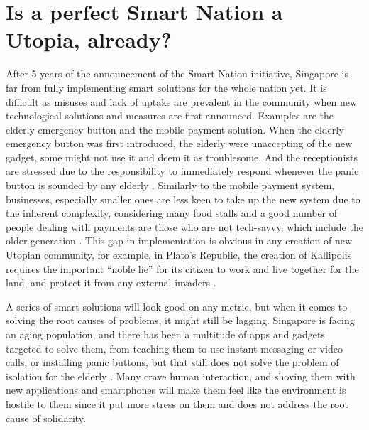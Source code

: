 \documentclass[11pt]{article}
\begin{document}
\section{Is a perfect Smart Nation a Utopia, already?}
\label{sec:org5a0a762}
After 5 years of the announcement of the Smart Nation initiative, Singapore is
far from fully implementing smart solutions for the whole nation yet. It is
difficult as misuses and lack of uptake are prevalent in the community when new
technological solutions and measures are first announced. Examples are the
elderly emergency button and the mobile payment solution. When the elderly
emergency button was first introduced, the elderly were unaccepting of the new
gadget, some might not use it and deem it as troublesome. And the receptionists
are stressed due to the responsibility to immediately respond whenever the panic
button is sounded by any elderly \cite{kong18_ideol_align_smart_urban_singap}.
Similarly to the mobile payment system, businesses, especially smaller ones are
less keen to take up the new system due to the inherent complexity, considering
many food stalls and a good number of people dealing with payments are those who
are not tech-savvy, which include the older generation \cite{elderly_shun_tech}.
This gap in implementation is obvious in any creation of new Utopian community,
for example, in Plato's Republic, the creation of Kallipolis requires the
important ``noble lie'' for its citizen to work and live together for the land,
and protect it from any external invaders \cite{republic}.

A series of smart solutions will look good on any metric, but when it comes to
solving the root causes of problems, it might still be lagging. Singapore is
facing an aging population, and there has been a multitude of apps and gadgets
targeted to solve them, from teaching them to use instant messaging or video
calls, or installing panic buttons, but that still does not solve the problem of
isolation for the elderly \cite{kong18_ideol_align_smart_urban_singap}. Many crave
human interaction, and shoving them with new applications and smartphones will
make them feel like the environment is hostile to them since it put more stress
on them and does not address the root cause of solidarity.
\end{document}
